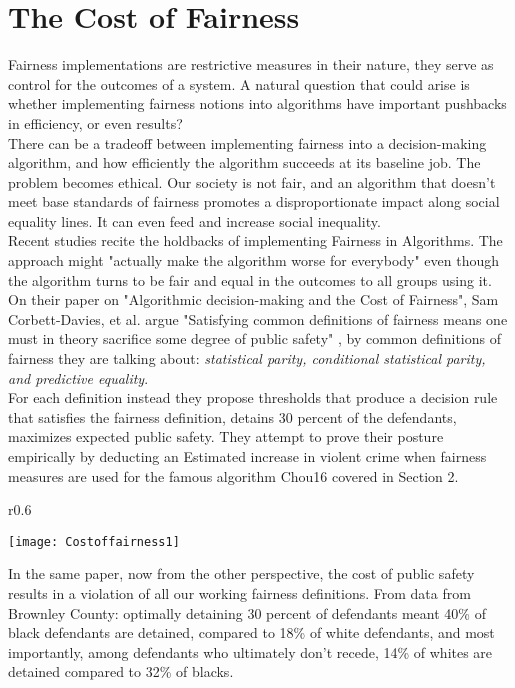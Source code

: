 \section{The Cost of Fairness}
Fairness implementations are restrictive measures in their nature, they serve as control for the outcomes of a system. A natural question that could arise is whether implementing fairness notions into algorithms have important pushbacks in efficiency, or even results?\cite{SHX05}\\
There can be a tradeoff between implementing fairness into a decision-making algorithm, and how efficiently the algorithm succeeds at its baseline job. The problem becomes ethical. Our society is not fair, and an algorithm that doesn't meet base standards of fairness promotes a disproportionate impact along social equality lines. It can even feed and increase social inequality.\cite{OBS*19} \\
Recent studies recite the holdbacks of implementing Fairness in Algorithms. The approach might "actually make the algorithm worse for everybody"\cite{Mill20}
even though the algorithm turns to be fair and equal in the outcomes to all groups using it. On their paper on "Algorithmic decision-making and the Cost of Fairness", Sam Corbett-Davies, et al. argue "Satisfying common definitions of fairness means one must in theory sacrifice some degree of public safety" \cite{CPF*17}, by common definitions of fairness they are talking about: \textsl{statistical parity, conditional statistical parity, and predictive equality}. \\
For each definition instead they propose thresholds that produce a decision rule that satisfies the fairness definition, detains 30 percent of the defendants, maximizes expected public safety.
They attempt to prove their posture empirically by deducting an Estimated increase in violent crime when fairness measures are used for the famous algorithm Chou16 covered in Section 2.
\begin{wrapfigure}{r}{0.6\textwidth}
  \begin{center}
    \texttt{[image: Costoffairness1]}
  \end{center}
\end{wrapfigure}

In the same paper, now from the other perspective, the cost of public safety results in a violation of all our working fairness definitions. From data from Brownley County: optimally detaining 30 percent of defendants meant 40\% of black defendants are detained, compared to 18\% of white defendants, and most importantly, among defendants who ultimately don't recede, 14\% of whites are detained compared to 32\% of blacks.\\

